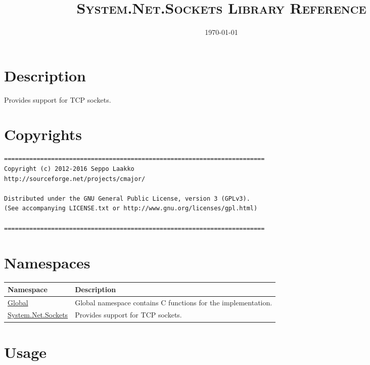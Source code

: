 \documentclass[a4paper,oneside,11.000000pt]{book}
\begin{document}
\clearpage

\frontmatter
\title{\textsc{System.Net.Sockets Library Reference}
}
\date{\today}
\maketitle
\tableofcontents

\clearpage
\chapter{Description}
\begin{flushleft}
Provides support for TCP sockets.

\end{flushleft}
\chapter{Copyrights}
\begin{verbatim}
========================================================================
Copyright (c) 2012-2016 Seppo Laakko
http://sourceforge.net/projects/cmajor/

Distributed under the GNU General Public License, version 3 (GPLv3).
(See accompanying LICENSE.txt or http://www.gnu.org/licenses/gpl.html)

========================================================================

\end{verbatim}
\clearpage
\chapter{Namespaces}
\begin{flushleft}
\begin{supertabular}[l]{!{\raggedright}p{4.52406cm}!{\raggedright}p{10.6259cm}}
\textbf{Namespace}
& \textbf{Description}
\\
\hline
\hyperlink{global}{Global}
& Global namespace contains C functions for the implementation.

\\
\hyperlink{System.Net.Sockets}{System.Net.Sockets}
& Provides support for TCP sockets.

\\
\end{supertabular}

\end{flushleft}
\clearpage
\mainmatter

\chapter{Usage}
\end{document}
